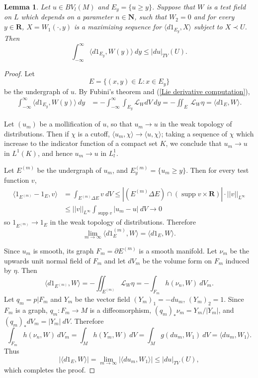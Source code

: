 \documentclass[reqno,12pt,letterpaper]{amsart}
\newcommand{\NN}{\mathbf{N}}
\newcommand{\RR}{\mathbf{R}}
\DeclareMathOperator{\supp}{supp}
\newtheorem{lemma}[theorem]{Lemma}
\theoremstyle{definition}
\numberwithin{equation}{section}
\begin{document}
\begin{lemma}\label{coarea converse}
Let $u \in BV_l(M)$ and $E_y = \{u \geq y\}$.
Suppose that $W$ is a test field on $L$ which depends on a parameter $n \in \NN$, such that $W_2 = 0$ and for every $y \in \RR$, $X = W_1(\cdot, y)$ is a maximizing sequence for $\langle d 1_{E_y}, X\rangle$ subject to $X \prec U$.
Then
$$\int_{-\infty}^\infty \langle d 1_{E_y}, W(y)\rangle ~dy \leq |d u|_{TV}(U).$$
\end{lemma}
\begin{proof}
Let
$$E = \{(x, y) \in L: x \in E_y\}$$
be the undergraph of $u$.
By Fubini's theorem and (\ref{Lie derivative computation}),
\begin{align*}
\int_{-\infty}^\infty \langle d 1_{E_y}, W(y)\rangle ~dy &= -\int_{-\infty}^\infty \int_{E_y} \mathcal L_WdV ~dy = -\iint_E ~\mathcal L_W\eta = \langle d 1_E, W\rangle.
\end{align*}

Let $(u_m)$ be a mollification of $u$, so that $u_m \to u$ in the weak topology of distributions.
Then if $\chi$ is a cutoff, $\langle u_m, \chi\rangle \to \langle u, \chi\rangle$; taking a sequence of $\chi$ which increase to the indicator function of a compact set $K$, we conclude that $u_m \to u$ in $L^1(K)$, and hence $u_m \to u$ in $L^1_l$.

Let $E^{(m)}$ be the undergraph of $u_m$, and $E^{(m)}_y = \{u_m \geq y\}$.
Then for every test function $v$,
\begin{align*}
\langle 1_{E^{(m)}} - 1_E, v\rangle &= \int_{E^{(m)} \Delta E} v ~dV \leq |(E^{(m)} \Delta E) \cap (\supp v \times \RR)| \cdot ||v||_{L^\infty}\\
&\leq ||v||_{L^\infty} \int_{\supp v} |u_m - u| ~dV \to 0
\end{align*}
so $1_{E^{(m)}} \to 1_E$ in the weak topology of distributions.
Therefore
$$\lim_{m \to \infty} \langle d 1_E^{(m)}, W\rangle = \langle d 1_E, W\rangle.$$

Since $u_m$ is smooth, its graph $F_m = \partial E^{(m)}$ is a smooth manifold.
Let $\nu_m$ be the upwards unit normal field of $F_m$ and let $dV_m$ be the volume form on $F_m$ induced by $\eta$.
Then
$$\langle d 1_{E^{(m)}}, W\rangle = -\iint_{E^{(m)}} \mathcal L_W\eta = -\int_{F_m} h(\nu_n, W) ~dV_m.$$
Let $q_m = p|F_m$ and $Y_m$ be the vector field $(Y_m)_1 = -d u_m$, $(Y_m)_2 = 1$.
Since $F_m$ is a graph, $q_m: F_m \to M$ is a diffeomorphism, $(q_m)_*\nu_m = Y_m/|Y_m|$, and $(q_m)_*dV_m = |Y_m|~dV$. Therefore
$$\int_{F_m} h(\nu_n, W) ~dV_m = \int_M h(Y_m, W) ~dV = \int_M g(d u_m, W_1) ~dV = \langle d u_m, W_1\rangle.$$
Thus
$$|\langle d 1_E, W\rangle| = \lim_{m \to \infty} |\langle d u_m, W_1\rangle| \leq |d u|_{TV}(U),$$
which completes the proof.
\end{proof}
\end{document}
